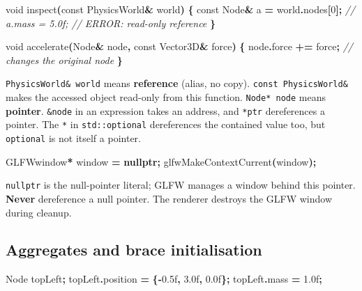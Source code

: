 \documentclass[
  10pt,
  a4paper,
]{article}
\newenvironment{Shaded}{\begin{snugshade}}{\end{snugshade}}
\newcommand{\AttributeTok}[1]{\textcolor[rgb]{0.13,0.29,0.53}{#1}}
\newcommand{\BuiltInTok}[1]{#1}
\newcommand{\CommentTok}[1]{\textcolor[rgb]{0.56,0.35,0.01}{\textit{#1}}}
\newcommand{\DataTypeTok}[1]{\textcolor[rgb]{0.13,0.29,0.53}{#1}}
\newcommand{\DecValTok}[1]{\textcolor[rgb]{0.00,0.00,0.81}{#1}}
\newcommand{\FloatTok}[1]{\textcolor[rgb]{0.00,0.00,0.81}{#1}}
\newcommand{\KeywordTok}[1]{\textcolor[rgb]{0.13,0.29,0.53}{\textbf{#1}}}
\newcommand{\NormalTok}[1]{#1}
\newcommand{\OperatorTok}[1]{\textcolor[rgb]{0.81,0.36,0.00}{\textbf{#1}}}
\begin{document}
\begin{Shaded}
\begin{Highlighting}[]
\DataTypeTok{void}\NormalTok{ inspect}\OperatorTok{(}\AttributeTok{const}\NormalTok{ PhysicsWorld}\OperatorTok{\&}\NormalTok{ world}\OperatorTok{)} \OperatorTok{\{}
    \AttributeTok{const}\NormalTok{ Node}\OperatorTok{\&}\NormalTok{ a }\OperatorTok{=}\NormalTok{ world}\OperatorTok{.}\NormalTok{nodes}\OperatorTok{[}\DecValTok{0}\OperatorTok{];}
    \CommentTok{// a.mass = 5.0f; // ERROR: read{-}only reference}
\OperatorTok{\}}

\DataTypeTok{void}\NormalTok{ accelerate}\OperatorTok{(}\NormalTok{Node}\OperatorTok{\&}\NormalTok{ node}\OperatorTok{,} \AttributeTok{const}\NormalTok{ Vector3D}\OperatorTok{\&}\NormalTok{ force}\OperatorTok{)} \OperatorTok{\{}
\NormalTok{    node}\OperatorTok{.}\NormalTok{force }\OperatorTok{+=}\NormalTok{ force}\OperatorTok{;} \CommentTok{// changes the original node}
\OperatorTok{\}}
\end{Highlighting}
\end{Shaded}

\texttt{PhysicsWorld\&\ world} means \textbf{reference} (alias, no
copy). \texttt{const\ PhysicsWorld\&} makes the accessed object
read-only from this function. \texttt{Node*\ node} means
\textbf{pointer}. \texttt{\&node} in an expression takes an address, and
\texttt{*ptr} dereferences a pointer. The \texttt{*} in
\texttt{std::optional} dereferences the contained value too, but
\texttt{optional} is not itself a pointer.

\begin{Shaded}
\begin{Highlighting}[]
\NormalTok{GLFWwindow}\OperatorTok{*}\NormalTok{ window }\OperatorTok{=} \KeywordTok{nullptr}\OperatorTok{;}
\NormalTok{glfwMakeContextCurrent}\OperatorTok{(}\NormalTok{window}\OperatorTok{);}
\end{Highlighting}
\end{Shaded}

\texttt{nullptr} is the null-pointer literal; GLFW manages a window
behind this pointer. \textbf{Never} dereference a null pointer. The
renderer destroys the GLFW window during cleanup.

\subsection{Aggregates and brace
initialisation}\label{aggregates-and-brace-initialisation}

\begin{Shaded}
\begin{Highlighting}[]
\NormalTok{Node topLeft}\OperatorTok{;}
\NormalTok{topLeft}\OperatorTok{.}\NormalTok{position }\OperatorTok{=} \OperatorTok{\{{-}}\FloatTok{0.5}\BuiltInTok{f}\OperatorTok{,} \FloatTok{3.0}\BuiltInTok{f}\OperatorTok{,} \FloatTok{0.0}\BuiltInTok{f}\OperatorTok{\};}
\NormalTok{topLeft}\OperatorTok{.}\NormalTok{mass }\OperatorTok{=} \FloatTok{1.0}\BuiltInTok{f}\OperatorTok{;}
\end{Highlighting}
\end{Shaded}
\end{document}
